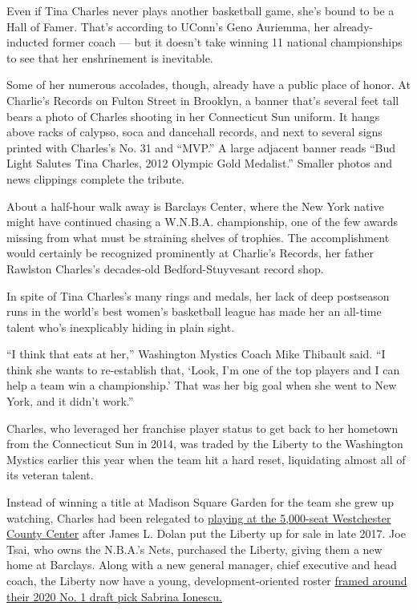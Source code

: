 Even if Tina Charles never plays another basketball game, she's bound to
be a Hall of Famer. That's according to UConn's Geno Auriemma, her
already-inducted former coach --- but it doesn't take winning 11
national championships to see that her enshrinement is inevitable.

Some of her numerous accolades, though, already have a public place of
honor. At Charlie's Records on Fulton Street in Brooklyn, a banner
that's several feet tall bears a photo of Charles shooting in her
Connecticut Sun uniform. It hangs above racks of calypso, soca and
dancehall records, and next to several signs printed with Charles's No.
31 and ``MVP.'' A large adjacent banner reads ``Bud Light Salutes Tina
Charles, 2012 Olympic Gold Medalist.'' Smaller photos and news clippings
complete the tribute.

About a half-hour walk away is Barclays Center, where the New York
native might have continued chasing a W.N.B.A. championship, one of the
few awards missing from what must be straining shelves of trophies. The
accomplishment would certainly be recognized prominently at Charlie's
Records, her father Rawlston Charles's decades-old Bedford-Stuyvesant
record shop.

In spite of Tina Charles's many rings and medals, her lack of deep
postseason runs in the world's best women's basketball league has made
her an all-time talent who's inexplicably hiding in plain sight.

``I think that eats at her,'' Washington Mystics Coach Mike Thibault
said. ``I think she wants to re-establish that, `Look, I'm one of the
top players and I can help a team win a championship.' That was her big
goal when she went to New York, and it didn't work.''

Charles, who leveraged her franchise player status to get back to her
hometown from the Connecticut Sun in 2014, was traded by the Liberty to
the Washington Mystics earlier this year when the team hit a hard reset,
liquidating almost all of its veteran talent.

Instead of winning a title at Madison Square Garden for the team she
grew up watching, Charles had been relegated to
\href{https://www.nytimes3xbfgragh.onion/2018/06/17/sports/basketball/liberty-westchester-wnba.html}{playing
at the 5,000-seat Westchester County Center} after James L. Dolan put
the Liberty up for sale in late 2017. Joe Tsai, who owns the N.B.A.'s
Nets, purchased the Liberty, giving them a new home at Barclays. Along
with a new general manager, chief executive and head coach, the Liberty
now have a young, development-oriented roster
\href{https://www.nytimes3xbfgragh.onion/2020/07/24/sports/basketball/wnba-eastern-conference-preview.html}{framed
around their 2020 No. 1 draft pick Sabrina Ionescu.}

